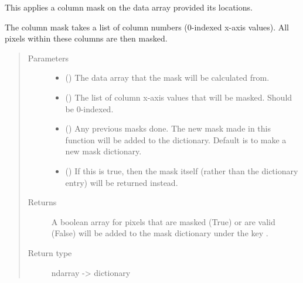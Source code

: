 \documentclass[letterpaper,10pt,english]{sphinxmanual}
\begin{document}
\begin{fulllineitems}
\label{\detokenize{python_docstrings/IfA_Smeargle.echo.masks.masks_echo300:IfA_Smeargle.echo.masks.masks_echo300.echo382_column_mask}}
This applies a column mask on the data array provided its locations.

The column mask takes a list of column numbers (0-indexed x-axis values). All pixels within
these columns are then masked.
\begin{quote}\begin{description}
\item[{Parameters}] \leavevmode\begin{itemize}
\item {} 
 () \textendash{} The data array that the mask will be calculated from.

\item {} 
 () \textendash{} The list of column x-axis values that will be masked. Should be 0-indexed.

\item {} 
 (\sphinxstyleliteralemphasis{\sphinxupquote{ (}}\sphinxstyleliteralemphasis{\sphinxupquote{)}}) \textendash{} Any previous masks done. The new mask made in this function will be added to the
dictionary. Default is to make a new mask dictionary.

\item {} 
 (\sphinxstyleliteralemphasis{\sphinxupquote{ (}}\sphinxstyleliteralemphasis{\sphinxupquote{)}}) \textendash{} If this is true, then the mask itself (rather than the dictionary entry) will be
returned instead.

\end{itemize}

\item[{Returns}] \leavevmode
{} \textendash{} A boolean array for pixels that are masked (True) or are valid (False) will be added to
the mask dictionary under the key .

\item[{Return type}] \leavevmode
ndarray -\textgreater{} dictionary

\end{description}\end{quote}

\end{fulllineitems}
\end{document}
